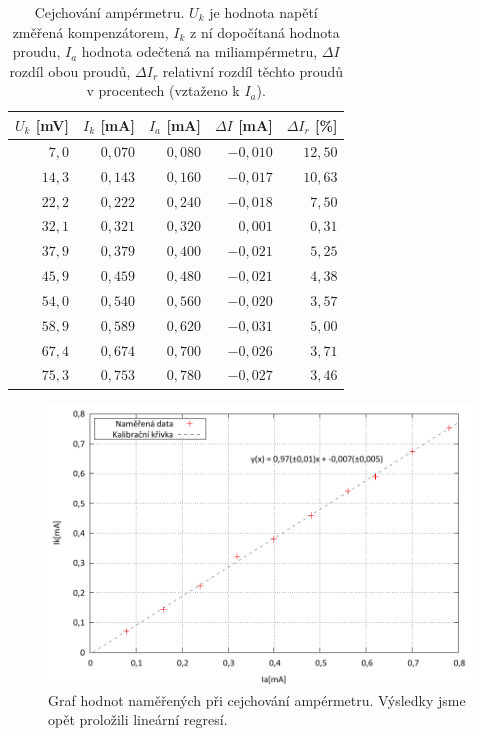 \documentclass[english]{article}
\begin{document}
\begin{table}[h]
\begin{center}
\begin{tabular}{|r|r|r|r|r|}
\hline
   $U_{k}$ [mV] & $I_{k}$ [mA] & $I_{a}$ [mA] & $\Delta I$ [mA] & $ \Delta I_{r} $ [\%]\\\hline
   
   $7,0$  & $0,070$ & $0,080$ & $-0,010$ & $12,50$\\ \hline
   $14,3$ & $0,143$ & $0,160$ & $-0,017$ & $10,63$\\ \hline
   $22,2$ & $0,222$ & $0,240$ & $-0,018$ &  $7,50$\\ \hline
   $32,1$ & $0,321$ & $0,320$ & $0,001$  &  $0,31$\\ \hline
   $37,9$ & $0,379$ & $0,400$ & $-0,021$ &  $5,25$\\ \hline
   $45,9$ & $0,459$ & $0,480$ & $-0,021$ &  $4,38$\\ \hline
   $54,0$ & $0,540$ & $0,560$ & $-0,020$ &  $3,57$\\ \hline
   $58,9$ & $0,589$ & $0,620$ & $-0,031$ &  $5,00$\\ \hline
   $67,4$ & $0,674$ & $0,700$ & $-0,026$ &  $3,71$\\ \hline
   $75,3$ & $0,753$ & $0,780$ & $-0,027$ &  $3,46$\\ \hline

\end{tabular}
\caption{Cejchování ampérmetru. $U_{k}$ je hodnota napětí změřená kompenzátorem, $I_{k}$ z ní dopočítaná hodnota proudu, $I_{a}$ hodnota odečtená na miliampérmetru, $\Delta I $ rozdíl obou proudů, $ \Delta I_{r} $ relativní rozdíl těchto proudů v procentech (vztaženo k $I_{a}$).}
\label{tab:cejchovani_ampermetru}
\end{center}
\end{table}

\begin{figure}[p]
\begin{center}
	\vspace*{-1cm}
	\includegraphics[width=\linewidth]{../gnuplot/7_kompenzator_cejamper_out.pdf}
	\vspace*{-1cm}
	\caption{Graf hodnot naměřených při cejchování ampérmetru. Výsledky jsme opět proložili lineární regresí.}
	\label{fig:g_cejchovani_a}
\end{center}
\end{figure}
\end{document}

